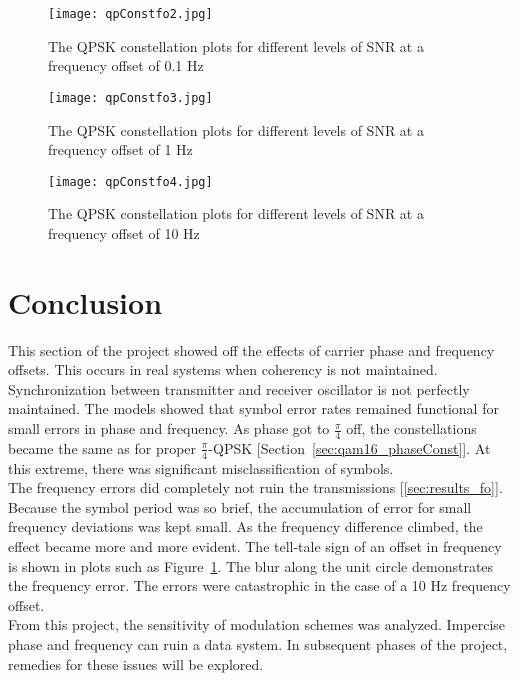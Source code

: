 \documentclass[]{article}
\begin{document}
\begin{figure}[H]
\centering
\hspace*{-2cm}\texttt{[image: qpConstfo2.jpg]}
\caption{The QPSK constellation plots for different levels of SNR at a frequency offset of 0.1 Hz}
\end{figure}

\begin{figure}[H]
\centering
\hspace*{-2cm}\texttt{[image: qpConstfo3.jpg]}
\caption{The QPSK constellation plots for different levels of SNR at a frequency offset of 1 Hz}
\end{figure}

\begin{figure}[H]
\centering
\hspace*{-2cm}\texttt{[image: qpConstfo4.jpg]}
\caption{The QPSK constellation plots for different levels of SNR at a frequency offset of 10 Hz \label{fig:qpsk_freq}}
\end{figure}


\newpage
\section{Conclusion}
\label{sec:conc}
This section of the project showed off the effects of carrier phase and frequency offsets.  This occurs in real systems when coherency is not maintained.  Synchronization between transmitter and receiver oscillator is not perfectly maintained.  The models showed that symbol error rates remained functional for small errors in phase and frequency.  As phase got to $\frac{\pi}{4}$ off, the constellations became the same as for proper $\frac{\pi}{4}$-QPSK [Section~\ref{sec:qam16_phaseConst}].  At this extreme, there was significant misclassification of symbols.  \\

The frequency errors did completely not ruin the transmissions [\ref{sec:results_fo}].  Because the symbol period was so brief, the accumulation of error for small frequency deviations was kept small.  As the frequency difference climbed, the effect became more and more evident.  The tell-tale sign of an offset in frequency is shown in plots such as Figure~\ref{fig:qpsk_freq}.  The blur along the unit circle demonstrates the frequency error.  The errors were catastrophic in the case of a 10 Hz frequency offset.  \\

From this project, the sensitivity of modulation schemes was analyzed.  Impercise phase and frequency can ruin a data system.  In subsequent phases of the project, remedies for these issues will be explored.
\end{document}
